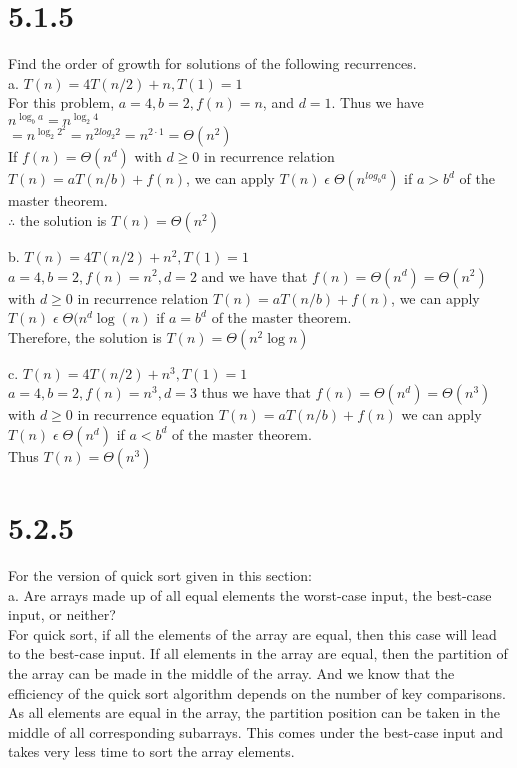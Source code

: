 \documentclass[8pt, letterpaper]{article}
\begin{document}
\section{5.1.5}
Find the order of growth for solutions of the following recurrences. \\
a. $T(n) = 4T(n/2) + n, T(1) = 1$ \\
For this problem, $a = 4, b = 2, f(n) = n$, and $d = 1$. Thus we have \\
\indent $n^{\log_b a} = n^{\log_2 4}$ \\
\indent \indent \indent $ = n^{\log_2 2^2} = n^{2log_2 2} = n^{2\cdot1} = \Theta(n^2) $ \\
If $f(n) = \Theta(n^d)$ with $d \ge 0$ in recurrence relation $T(n) = a T(n/b) + f(n)$, we can apply $T(n) \; \epsilon \; \Theta(n^{log_b a})$ if $a > b^d$ of the master theorem. \\
$\therefore$ the solution is $T(n) = \Theta(n^2)$

b. $T(n) = 4T(n/2) + n^2, T(1) = 1$ \\ 
$a = 4, b = 2, f(n) = n^2, d = 2$ and we have that $f(n) = \Theta(n^d) = \Theta(n^2)$ with $d \ge 0$ in recurrence relation $T(n) = a T(n/b) + f(n)$, we can apply $T(n) \; \epsilon \; \Theta(n^d \log(n)$ if $a = b^d$ of the master theorem.\\
Therefore, the solution is $T(n) = \Theta(n^2 \log n)$

c. $T(n) = 4T(n/2) + n^3, T(1) = 1$ \\
$a = 4, b = 2, f(n) = n^3, d = 3$ thus we have that $f(n) = \Theta(n^d) = \Theta(n^3)$ with $d \ge 0$ in recurrence equation $T(n) = a T(n/b) + f(n)$ we can apply $T(n) \; \epsilon \; \Theta(n^d)$ if $a < b^d$ of the master theorem. \\
Thus $T(n) = \Theta(n^3)$

\section{5.2.5}
For the version of quick sort given in this section: \\
a. Are arrays made up of all equal elements the worst-case input, the best-case input, or neither? \\
For quick sort, if all the elements of the array are equal, then this case will lead to the best-case input. If all elements in the array are equal, then the partition of the array can be made in the middle of the array. And we know that the efficiency of the quick sort algorithm depends on the number of key comparisons. As all elements are equal in the array, the partition position can be taken in the middle of all corresponding subarrays. This comes under the best-case input and takes very less time to sort the array elements.
\end{document}
